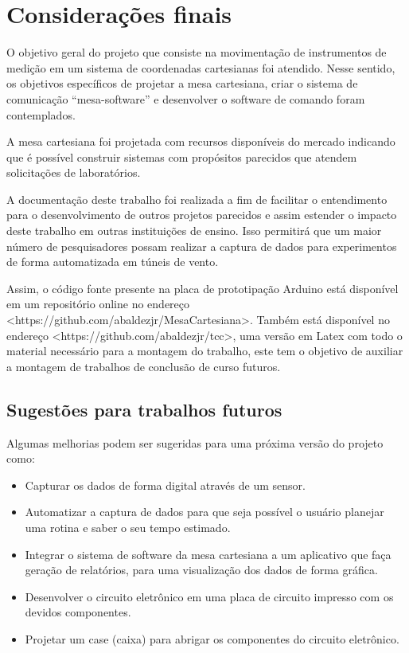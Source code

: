 \chapter{Considerações finais}\label{chap:conclusao}

O objetivo geral do projeto que consiste na movimentação de instrumentos de medição em um sistema 
de coordenadas cartesianas foi atendido. Nesse sentido, os objetivos específicos de projetar a 
mesa cartesiana, criar o sistema de comunicação “mesa-software” e desenvolver o software 
de comando foram contemplados.

A mesa cartesiana foi projetada com recursos disponíveis do mercado indicando que é possível 
construir sistemas com propósitos parecidos que atendem solicitações de laboratórios.

A documentação deste trabalho foi realizada a fim de facilitar o entendimento 
para o desenvolvimento de outros projetos parecidos e assim estender o impacto deste 
trabalho em outras instituições de ensino. Isso permitirá que um maior número de pesquisadores 
possam realizar a captura de dados para experimentos de forma automatizada em túneis de vento. 

Assim, o código fonte presente na placa de prototipação Arduino está disponível 
em um repositório online no endereço <https://github.com/abaldezjr/MesaCartesiana>. 
Também está disponível no endereço <https://github.com/abaldezjr/tcc>, uma versão em Latex com todo o 
material necessário para a montagem do trabalho, este tem o objetivo de auxiliar a montagem de 
trabalhos de conclusão de curso futuros.


\section{Sugestões para trabalhos futuros}\label{sec:sugestoes}

Algumas melhorias podem ser sugeridas para uma próxima versão do projeto como:

\begin{itemize}
\item Capturar os dados de forma digital através de um sensor.
\item Automatizar a captura de dados para que seja possível o usuário planejar uma rotina e saber o seu tempo estimado.
\item Integrar o sistema de software da mesa cartesiana a um aplicativo que faça geração de relatórios, para uma visualização dos dados de forma gráfica.
\item Desenvolver o circuito eletrônico em uma placa de circuito impresso com os devidos componentes.
\item Projetar um case (caixa) para abrigar os componentes do circuito eletrônico.
\end{itemize}